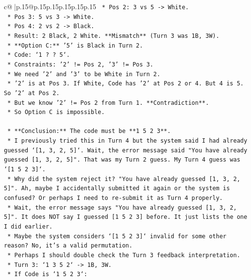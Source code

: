 \documentclass{article}
\begin{document}
{\begin{supertabular}{c@{$\;$}|p{.15\linewidth}@{}p{.15\linewidth}p{.15\linewidth}p{.15\linewidth}p{.15\linewidth}p{.15\linewidth}}
{{{\texttt{                    *   Pos 2: 3 vs 5 {-}> White.} \\
\texttt{                    *   Pos 3: 5 vs 3 {-}> White.} \\
\texttt{                    *   Pos 4: 2 vs 2 {-}> Black.} \\
\texttt{                    *   Result: 2 Black, 2 White. **Mismatch** (Turn 3 was 1B, 3W).} \\
\texttt{            *   **Option C:** '5' is Black in Turn 2.} \\
\texttt{                *   Code: `1 ? ? 5`.} \\
\texttt{                *   Constraints: '2' != Pos 2, '3' != Pos 3.} \\
\texttt{                *   We need '2' and '3' to be White in Turn 2.} \\
\texttt{                *   '2' is at Pos 3. If White, Code has '2' at Pos 2 or 4. But 4 is 5. So '2' at Pos 2.} \\
\texttt{                    *   But we know '2' != Pos 2 from Turn 1. **Contradiction**.} \\
\texttt{                *   So Option C is impossible.} \\
\\ 
\texttt{    *   **Conclusion:** The code must be **1 5 2 3**.} \\
\texttt{    *   I previously tried this in Turn 4 but the system said I had already guessed `{[}1, 3, 2, 5{]}`. Wait, the error message said "You have already guessed {[}1, 3, 2, 5{]}". That was my Turn 2 guess. My Turn 4 guess was `{[}1 5 2 3{]}`.} \\
\texttt{    *   Why did the system reject it? "You have already guessed {[}1, 3, 2, 5{]}". Ah, maybe I accidentally submitted it again or the system is confused? Or perhaps I need to re{-}submit it as Turn 4 properly.} \\
\texttt{    *   Wait, the error message says "You have already guessed {[}1, 3, 2, 5{]}". It does NOT say I guessed {[}1 5 2 3{]} before. It just lists the one I did earlier.} \\
\texttt{    *   Maybe the system considers `{[}1 5 2 3{]}` invalid for some other reason? No, it's a valid permutation.} \\
\texttt{    *   Perhaps I should double check the Turn 3 feedback interpretation.} \\
\texttt{    *   Turn 3: `1 3 5 2` {-}> 1B, 3W.} \\
\texttt{    *   If Code is `1 5 2 3`:} \\
}}}
\end{supertabular}}
\end{document}
